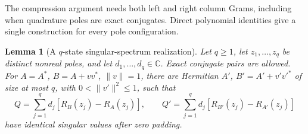 \documentclass[11pt]{article}
\newtheorem{lemma}[theorem]{Lemma}
\numberwithin{equation}{section}
\newcommand{\C}{\mathbb C}
\begin{document}
The compression argument needs both left and right column Grams,
including when quadrature poles are exact conjugates. Direct polynomial
identities give a single construction for every pole configuration.

\begin{lemma}[A $q$-state singular-spectrum realization]\label{lem:qstate}
Let $q\ge1$, let $z_1,\ldots,z_q$ be distinct nonreal poles, and let
$d_1,\ldots,d_q\in\C$. Exact conjugate pairs are allowed.
For $A=A^*$, $B=A+vv^*$, $\|v\|=1$, there are Hermitian
$A'$, $B'=A'+v'v'^*$ of size at most $q$, with
$0<\|v'\|^2\le1$, such that
\begin{equation}\label{eq:matchedquad}
 Q=\sum_{j=1}^q d_j[R_B(z_j)-R_A(z_j)],\qquad
 Q'=\sum_{j=1}^q d_j[R_{B'}(z_j)-R_{A'}(z_j)]
\end{equation}
have identical singular values after zero padding.
\end{lemma}
\end{document}
